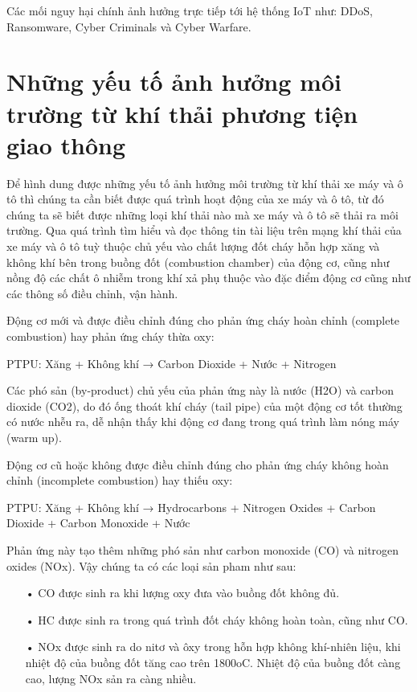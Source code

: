 Các mối nguy hại chính ảnh hưởng trực tiếp tới hệ thống IoT như: DDoS, Ransomware, Cyber Criminals và Cyber Warfare. 




\section{Những yếu tố ảnh hưởng môi trường từ khí thải phương tiện giao thông}\label{sec:yeuto_khithai}
Để hình dung được những yếu tố ảnh hưởng môi trường từ khí thải xe máy và ô tô thì chúng ta cần biết được quá trình hoạt động của xe máy và ô tô, từ đó chúng ta sẽ biết được những loại khí thải nào mà xe máy và ô tô sẽ thải ra môi trường. Qua quá trình tìm hiểu và đọc thông tin tài liệu trên mạng khí thải của xe máy và ô tô tuỳ thuộc chủ yếu vào chất lượng đốt cháy hỗn hợp xăng và không khí bên trong buồng đốt (combustion chamber) của động cơ, cũng như nồng độ các chất ô nhiễm trong khí xả phụ thuộc vào đặc điểm động cơ cũng như các thông số điều chỉnh, vận hành.

Động cơ mới và được điều chỉnh đúng cho phản ứng cháy hoàn chỉnh (complete combustion) hay phản ứng cháy thừa oxy:

\begin{center}
	PTPU: Xăng + Không khí → Carbon Dioxide + Nước + Nitrogen
\end{center} 
Các phó sản (by-product) chủ yếu của phản ứng này là nước (H2O) và carbon dioxide (CO2), do đó ống thoát khí cháy (tail pipe) của một động cơ tốt thường có nước nhễu ra, dễ nhận thấy khi động cơ đang trong quá trình làm nóng máy (warm up).

Động cơ cũ hoặc không được điều chỉnh đúng cho phản ứng cháy không hoàn chỉnh (incomplete combustion) hay thiếu oxy:
\begin{center}
	PTPU: Xăng + Không khí → Hydrocarbons + Nitrogen Oxides + Carbon Dioxide + Carbon Monoxide + Nước
\end{center}

Phản ứng này tạo thêm những phó sản như carbon monoxide (CO) và nitrogen oxides (NOx). Vậy chúng ta có các loại sản pham như sau:
\begin{itemize}
	\item[•]CO được sinh ra khi lượng oxy đưa vào buồng đốt không đủ.
	\item[•]HC được sinh ra trong quá trình đốt cháy không hoàn toàn, cũng như CO.
	\item[•]NOx được sinh ra do nitơ và ôxy trong hỗn hợp không khí-nhiên liệu, khi nhiệt độ của buồng đốt tăng cao trên 1800oC. Nhiệt độ của buồng đốt càng cao, lượng NOx sản ra càng nhiều.
\end{itemize}

